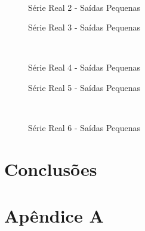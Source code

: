 \documentclass[12pt]{article}
\begin{document}
\begin{figure}
\begin{center}
\\
\caption{Série Real 2 - Saídas Pequenas}
\label{2-real}
\end{center}
\end{figure}

\begin{figure}
\begin{center}

\caption{Série Real 3 - Saídas Pequenas}
\label{3-real}
\end{center}
\end{figure}

\begin{figure}
\begin{center}
\\
\caption{Série Real 4 - Saídas Pequenas}
\label{3-real}
\end{center}
\end{figure}


\begin{figure}
\begin{center}

\caption{Série Real 5 - Saídas Pequenas}
\end{center}
\end{figure}

\begin{figure}
\begin{center}
\\
\caption{Série Real 6 - Saídas Pequenas}
\end{center}
\end{figure}
\section{Conclusões}

\section{Apêndice A}
\end{document}
